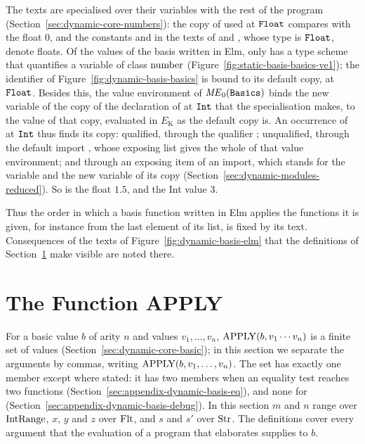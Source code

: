 The texts are specialised over their  variables with the rest of
the program (Section~\ref{sec:dynamic-core-numbers}): the copy of  used
at $\mathtt{Float}$ compares with the float $0$, and the constants  and
 in the texts of  and , whose type is $\mathtt{Float}$,
denote floats. %
Of the values of the basis written in Elm, only  has a type scheme
that quantifies a variable of class $\mathrm{number}$
(Figure~\ref{fig:static-basis-basics-ve1}); the identifier  of
Figure~\ref{fig:dynamic-basis-basics} is bound to its default copy, at
$\mathtt{Float}$. Besides this, the value environment of $\mathit{ME}_0(\textnormal{\texttt{Basics}})$ binds
the new variable of the copy of the declaration of  at $\mathtt{Int}$
that the specialisation makes, to the value of that copy, evaluated in
$E_{\mathrm{K}}$ as the default copy is. An occurrence of  at
$\mathtt{Int}$ thus finds its copy: qualified, through the qualifier
; unqualified, through the default import
, whose exposing list gives the whole of
that value environment; and through an exposing item  of an
import, which stands for the variable and the new variable of its copy
(Section~\ref{sec:dynamic-modules-reduced}).
So  is the float $1.5$, and  the Int value $3$. %

Thus the order in which a basis function written in Elm applies the functions
it is given, for instance  from the last element of its list,
is fixed by its text. %
Consequences of the texts of Figure~\ref{fig:dynamic-basis-elm} that the
definitions of Section~\ref{sec:appendix-dynamic-basis-apply} make visible
are noted there. %

\section{The Function APPLY}\label{sec:appendix-dynamic-basis-apply}

For a basic value $b$ of arity $n$ and values $v_1,\ldots,v_n$,
$\mathrm{APPLY}(b,v_1\cdots v_n)$ is a finite set of values
(Section~\ref{sec:dynamic-core-basic}); in this section we separate the
arguments by commas, writing $\mathrm{APPLY}(b,v_1,\ldots,v_n)$. The set has exactly
one member except where stated: it has two members when an equality test
reaches two functions (Section~\ref{sec:appendix-dynamic-basis-eq}), and none
for  (Section~\ref{sec:appendix-dynamic-basis-debug}).
In this section $m$ and $n$ range over $\mathrm{IntRange}$, $x$, $y$ and $z$ over
$\mathrm{Flt}$, and $s$ and $s'$ over $\mathrm{Str}$.
The definitions cover every argument that the evaluation of a program that
elaborates supplies to $b$.

